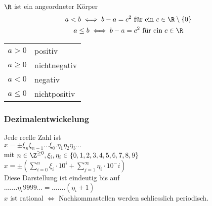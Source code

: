 $\R$ ist ein angeordneter Körper \\
\begin{gather*}
	a < b \iff b - a = c^2 \text{ für ein } c \in \R \setminus \{0\} \\
	a \leq b \iff b - a = c^2 \text{ für ein } c \in \R
\end{gather*}

\begin{tabular}{ll}
	$a > 0$	&positiv		\\
	$a \geq 0$	&nichtnegativ	\\
	$a < 0$	&negativ		\\
	$a \leq 0$	&nichtpositiv	
\end{tabular}

\subsubsection{Dezimalentwickelung}
Jede reelle Zahl ist\\
$x = \pm \xi_n \xi_{n-1} \dots \xi_0 . \eta_1 \eta_2 \eta_3 \dots$\\
mit $n \in \Z^{\geq 0}, \xi_i, \eta_i \in \{ 0, 1, 2, 3, 4, 5, 6, 7, 8, 9 \}$\\
$x = \pm \left( \sum_{i=0}^n \xi_i \cdot 10^i + \sum_{j=1}^\infty \eta_i \cdot10^-i \right)$\\
Diese Darstellung ist eindeutig bis auf\\
$ \dots . \dots \eta_i 9999\dots = \dots . \dots (\eta_i +1)$\\
$x$ ist rational $\iff$ Nachkommastellen werden schliesslich periodisch.

